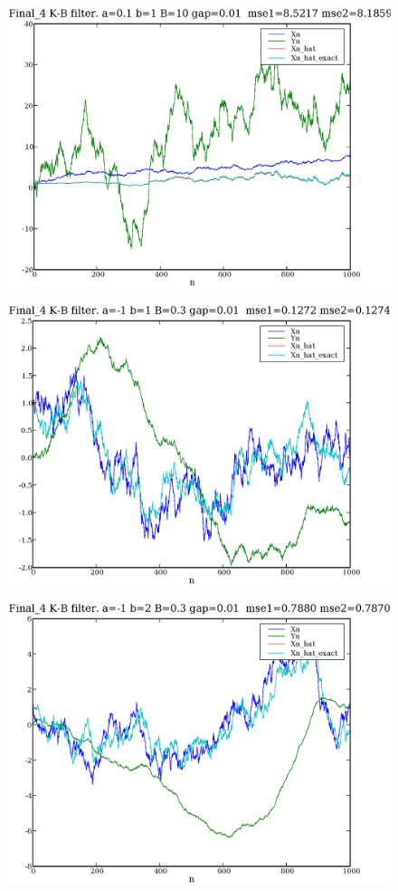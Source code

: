 \documentclass[a4paper,10pt]{article}
\begin{document}
\begin{figure}
\includegraphics[width=1\textwidth]{Final_4_Xn_Yn_Xn_hat_a_0.1_b_1_B_10_gap_0.01.eps}
\caption{}\label{f11}
\end{figure}

\begin{figure}
\includegraphics[width=1\textwidth]{Final_4_Xn_Yn_Xn_hat_a_-1_b_1_B_0.3_gap_0.01.eps}
\caption{}\label{f12}
\end{figure}

\begin{figure}
\includegraphics[width=1\textwidth]{Final_4_Xn_Yn_Xn_hat_a_-1_b_2_B_0.3_gap_0.01.eps}
\caption{}\label{f13}
\end{figure}
\end{document}
